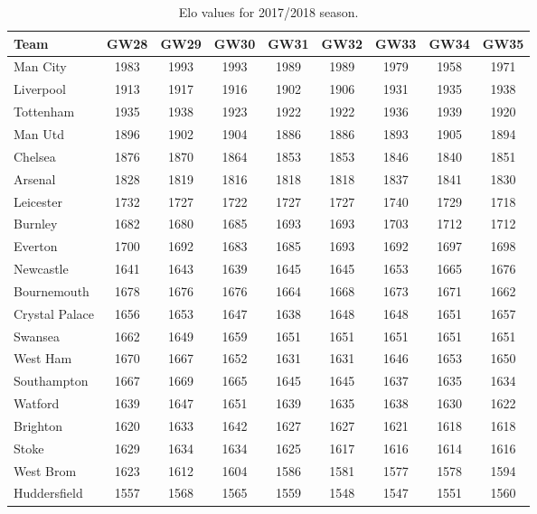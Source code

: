 \begin{table}[H]
\centering
\smaller
\begin{tabular}{|l|c|c|c|c|c|c|c|c|}
\hline
Team           & GW28 & GW29 & GW30 & GW31 & GW32 & GW33 & GW34 & GW35 \\
\hline
Man City       & 1983 & 1993 & 1993 & 1989 & 1989 & 1979 & 1958 & 1971 \\
Liverpool      & 1913 & 1917 & 1916 & 1902 & 1906 & 1931 & 1935 & 1938 \\
Tottenham      & 1935 & 1938 & 1923 & 1922 & 1922 & 1936 & 1939 & 1920 \\
Man Utd        & 1896 & 1902 & 1904 & 1886 & 1886 & 1893 & 1905 & 1894 \\
Chelsea        & 1876 & 1870 & 1864 & 1853 & 1853 & 1846 & 1840 & 1851 \\
Arsenal        & 1828 & 1819 & 1816 & 1818 & 1818 & 1837 & 1841 & 1830 \\
Leicester      & 1732 & 1727 & 1722 & 1727 & 1727 & 1740 & 1729 & 1718 \\
Burnley        & 1682 & 1680 & 1685 & 1693 & 1693 & 1703 & 1712 & 1712 \\
Everton        & 1700 & 1692 & 1683 & 1685 & 1693 & 1692 & 1697 & 1698 \\
Newcastle      & 1641 & 1643 & 1639 & 1645 & 1645 & 1653 & 1665 & 1676 \\
Bournemouth    & 1678 & 1676 & 1676 & 1664 & 1668 & 1673 & 1671 & 1662 \\
Crystal Palace & 1656 & 1653 & 1647 & 1638 & 1648 & 1648 & 1651 & 1657 \\
Swansea        & 1662 & 1649 & 1659 & 1651 & 1651 & 1651 & 1651 & 1651 \\
West Ham       & 1670 & 1667 & 1652 & 1631 & 1631 & 1646 & 1653 & 1650 \\
Southampton    & 1667 & 1669 & 1665 & 1645 & 1645 & 1637 & 1635 & 1634 \\
Watford        & 1639 & 1647 & 1651 & 1639 & 1635 & 1638 & 1630 & 1622 \\
Brighton       & 1620 & 1633 & 1642 & 1627 & 1627 & 1621 & 1618 & 1618 \\
Stoke          & 1629 & 1634 & 1634 & 1625 & 1617 & 1616 & 1614 & 1616 \\
West Brom      & 1623 & 1612 & 1604 & 1586 & 1581 & 1577 & 1578 & 1594 \\
Huddersfield   & 1557 & 1568 & 1565 & 1559 & 1548 & 1547 & 1551 & 1560 \\
\hline
\end{tabular}
\caption{Elo values for 2017/2018 season.}
\label{tab:elo_values_gameweeks_4}
\end{table}



